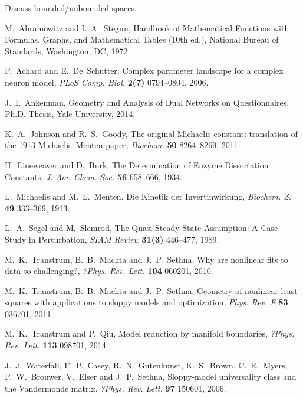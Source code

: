 \documentclass{article}
\begin{document}
Discuss bounded/unbounded spaces.\\


\begin{thebibliography}{99}
%

M.~Abramowitz and I.~A.~Stegun,
Handbook of Mathematical Functions
with Formulas, Graphs, and Mathematical Tables (10th ed.),
National Bureau of Standards, Washington, DC, 1972.

P.~Achard and E.~De~Schutter,
Complex parameter landscape for a complex neuron model,
{\it PLoS Comp. Biol.} \textbf{2(7)} 0794--0804, 2006.

J.~I.~Ankenman,
Geometry and Analysis of Dual Networks on Questionnaires,
Ph.D. Thesis, Yale University, 2014.

K.~A.~Johnson and R.~S.~Goody,
The original Michaelis constant:
translation of the 1913 Michaelis--Menten paper,
{\it Biochem.} \textbf{50} 8264--8269, 2011.

H.~Lineweaver and D.~Burk,
The Determination of Enzyme Dissociation Constants,
{\it J. Am. Chem. Soc.} \textbf{56} 658--666, 1934.

L.~Michaelis and M.~L.~Menten,
Die Kinetik der Invertinwirkung,
{\it Biochem. Z.} \textbf{49} 333--369, 1913.

L.~A.~Segel and M.~Slemrod,
The Quasi-Steady-State Assumption:
A Case Study in Perturbation,
{\it SIAM Review} \textbf{31(3)} 446--477, 1989.

M.~K.~Transtrum, B.~B.~Machta and J.~P.~Sethna,
Why are nonlinear fits to data so challenging?,
{\it ?Phys. Rev. Lett.} \textbf{104} 060201, 2010.

M.~K.~Transtrum, B.~B.~Machta and J.~P.~Sethna,
Geometry of nonlinear least squares
with applications to sloppy models and optimization,
{\it Phys. Rev. E} \textbf{83} 036701, 2011.

M.~K.~Transtrum and P.~Qiu,
Model reduction by manifold boundaries,
{\it ?Phys. Rev. Lett.} \textbf{113} 098701, 2014.

J.~J.~Waterfall, F.~P.~Casey, R.~N.~Gutenkunst, K.~S.~Brown, C.~R.~Myers,
P.~W.~Brouwer, V.~Elser and J.~P.~Sethna,
Sloppy-model universality class and the Vandermonde matrix,
{\it ?Phys. Rev. Lett.} \textbf{97} 150601, 2006.

\end{thebibliography}
\end{document}
